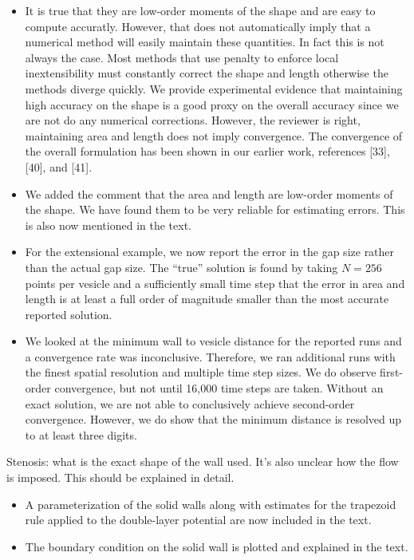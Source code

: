 \documentclass[11pt]{article}
\newcommand{\comment}[1]{{\color{blue} #1}}
\begin{document}
\begin{itemize}
  \item It is true that they are low-order moments of the shape and are
  easy to compute accuratly.  However, that does not automatically
  imply that a numerical method will easily maintain these quantities.
  In fact this is not always the case.  Most methods that use penalty
  to enforce local inextensibility must constantly correct the shape
  and length otherwise the methods diverge quickly.  We provide
  experimental evidence that maintaining high accuracy on the shape is
  a good proxy on the overall accuracy since we are not do any
  numerical corrections.  However, the reviewer is right, maintaining
  area and length does not imply convergence. The convergence of the
  overall formulation has been shown in our earlier work,  references
  [33], [40], and [41]. 

  \item We added the comment that the area and length are low-order
  moments of the shape. We have found them to be very reliable for
  estimating errors.  This is also now mentioned in the text.

  \item For the extensional example, we now report the error in the gap
  size rather than the actual gap size.  The ``true'' solution is found
  by taking $N=256$ points per vesicle and a sufficiently small time
  step that the error in area and length is at least a full order of
  magnitude smaller than the most accurate reported solution.

  \item We looked at the minimum wall to vesicle distance for the
  reported runs and a convergence rate was inconclusive.  Therefore, we
  ran additional runs with the finest spatial resolution and multiple
  time step sizes.  We do observe first-order convergence, but not
  until 16,000 time steps are taken.  Without an exact solution,
  we are not able to conclusively achieve second-order convergence.
  However, we do show that the minimum distance is resolved up to at
  least three digits.
\end{itemize}


\comment{Stenosis: what is the exact shape of the wall used. It’s also
unclear how the flow is imposed. This should be explained in detail.}
\begin{itemize}
  \item A parameterization of the solid walls along with estimates for
  the trapezoid rule applied to the double-layer potential are now
  included in the text.

  \item The boundary condition on the solid wall is plotted and
  explained in the text.

\end{itemize}
\end{document}
